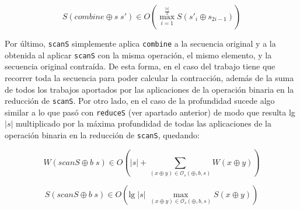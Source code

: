 \documentclass[a4paper,10pt]{article}
\begin{document}
\begin{equation*}
    S \left( combine \oplus s \; s' \right) \in
    O \left( \max_{i=1}^{\frac{\vert s \vert}{2}} S \left( s'_{i} \oplus s_{2i-1} \right) \right)
\end{equation*}

Por último, \texttt{scanS} simplemente aplica \texttt{combine} a la secuencia original
y a la obtenida al aplicar \texttt{scanS} con la misma operación, el mismo elemento,
y la secuencia original contraída. De esta forma, en el caso del trabajo tiene
que recorrer toda la secuencia para poder calcular la contracción, además de la
suma de todos los trabajos aportados por las aplicaciones de la operación binaria
en la reducción de \texttt{scanS}. Por otro lado, en el caso de la profundidad
sucede algo similar a lo que pasó con \texttt{reduceS} (ver apartado anterior) de
modo que resulta lg $\vert s \vert$ multiplicado por la máxima profundidad de
todas las aplicaciones de la operación binaria en la reducción de \texttt{scanS},
quedando:

\begin{equation*}
    W \left( scanS \oplus b \; s \right) \in
    O \left( \vert s \vert + \sum_{(x \oplus y) \in \mathcal{O}_s(\oplus,b,s)} W \left( x \oplus y \right) \right)
\end{equation*}

\begin{equation*}
    S \left( scanS \oplus b \; s \right) \in
    O \left( \text{lg} \; \vert s \vert \; \max_{(x \oplus y) \in \mathcal{O}_s(\oplus,b,s)} S \left( x \oplus y \right) \right)
\end{equation*}
\end{document}
